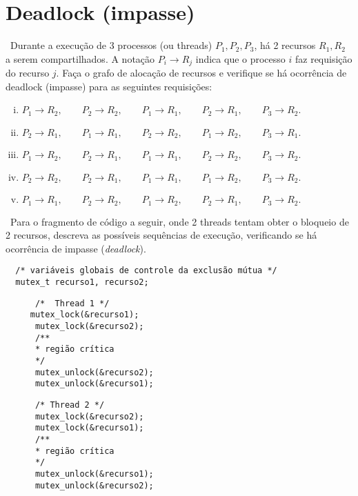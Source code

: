 \section*{Deadlock (impasse)}

\exercise~Durante a execução de 3 processos (ou threads) $P_1, P_2,
P_3$, há 2 recursos $R_1, R_2$ a serem compartilhados. A notação
$P_i\rightarrow R_j$ indica que o processo $i$ faz requisição do
recurso $j$.  Faça o grafo de alocação de recursos e verifique se há
ocorrência de deadlock (impasse) para as seguintes requisições:

\begin{enumerate}[i)]
\item  $P_1 \rightarrow R_2,\qquad P_2 \rightarrow R_2, \qquad P_1
  \rightarrow R_1,\qquad P_2 \rightarrow R_1, \qquad P_3 \rightarrow
  R_2.$

\item  $P_2 \rightarrow R_1,\qquad P_1 \rightarrow R_1, \qquad P_2
  \rightarrow R_2,\qquad P_1 \rightarrow R_2, \qquad P_3 \rightarrow
  R_1.$
\item  $P_1 \rightarrow R_2,\qquad P_2 \rightarrow R_1, \qquad P_1
  \rightarrow R_1,\qquad P_2 \rightarrow R_2, \qquad P_3 \rightarrow
  R_2.$

\item  $P_2 \rightarrow R_2,\qquad P_2 \rightarrow R_1, \qquad P_1
  \rightarrow R_1,\qquad P_1 \rightarrow R_2, \qquad P_3 \rightarrow
  R_2.$

\item  $P_1 \rightarrow R_1,\qquad P_2 \rightarrow R_2, \qquad P_1
  \rightarrow R_2,\qquad P_2 \rightarrow R_1, \qquad P_3 \rightarrow
  R_2.$

\end{enumerate}

\exercise~Para o fragmento de código a seguir, onde 2 threads tentam
obter o bloqueio de 2 recursos, descreva as possíveis sequências de
execução, verificando se há ocorrência de impasse ({\em deadlock}).


\begin{lstlisting}
  /* variáveis globais de controle da exclusão mútua */
  mutex_t recurso1, recurso2; 
\end{lstlisting}
\lstset{frame=single}
\begin{minipage}{.5\textwidth}
    \begin{lstlisting}
      /*  Thread 1 */
     mutex_lock(&recurso1);
      mutex_lock(&recurso2);
      /**
      * região crítica
      */
      mutex_unlock(&recurso2);
      mutex_unlock(&recurso1);
    \end{lstlisting}
\end{minipage}
\begin{minipage}{.5\textwidth}
    \begin{lstlisting}
      /* Thread 2 */
      mutex_lock(&recurso2);
      mutex_lock(&recurso1);
      /**
      * região crítica
      */
      mutex_unlock(&recurso1);
      mutex_unlock(&recurso2);
    \end{lstlisting}
\end{minipage}


